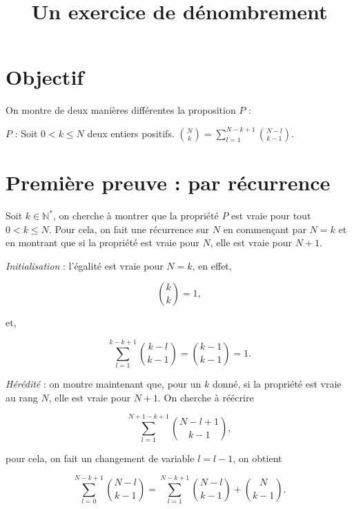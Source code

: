 \documentclass{article}
\begin{document}
\title{Un exercice de dénombrement}

\maketitle

\section{Objectif}

On montre de deux manières différentes la proposition $P$ :\newline

$P$ : Soit $0<k \leq N $ deux entiers positifs. ${N \choose k} = \sum_{l=1}^{N-k+1} {N-l \choose k-1}$.

\section{Première preuve :  par récurrence}

Soit $ k \in \mathbb{N}^* $, on cherche à montrer que la propriété $P$ est vraie pour tout $0<k \leq N$. Pour cela, on fait une récurrence sur $N$ en commençant par $N=k$ et en montrant que si la propriété est vraie pour $N$, elle est vraie pour $N+1$.

\textit{Initialisation} : l'égalité est vraie pour $N=k$, en effet,

\begin{equation*}
{k \choose k} = 1,
\end{equation*}

et,

\begin{equation*}
\sum_{l=1}^{k-k+1} {k-l \choose k-1} = {k-1 \choose k-1} = 1.
\end{equation*}

\textit{Hérédité} : on montre maintenant que, pour un $k$ donné, si la propriété est vraie au rang $N$, elle est vraie pour $N+1$. On cherche à réécrire

\begin{equation*}
\sum_{l=1}^{N+1-k+1} {N-l+1 \choose k-1},
\end{equation*}

pour cela, on fait un changement de variable $l=l-1$, on obtient

\begin{equation*}
\sum_{l=0}^{N-k+1} {N-l \choose k-1} = \sum_{l=1}^{N-k+1} {N-l \choose k-1} + {N \choose k-1}.
\end{equation*}
\end{document}
